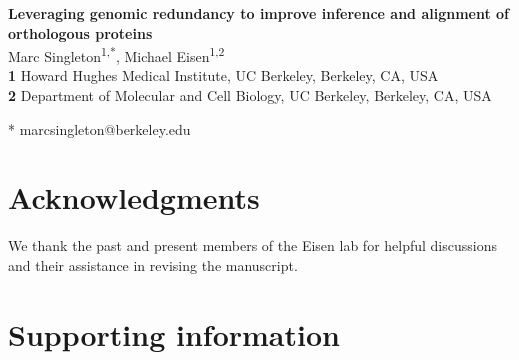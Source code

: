 \documentclass[11pt,letterpaper]{article}
\begin{document}
\begin{flushleft}
{\Large\textbf{Leveraging genomic redundancy to improve inference and alignment of orthologous proteins}}
\\
\bigskip
Marc Singleton\textsuperscript{1,*},
Michael Eisen\textsuperscript{1,2}
\\
\bigskip
\textbf{1} Howard Hughes Medical Institute, UC Berkeley, Berkeley, CA, USA
\\
\textbf{2} Department of Molecular and Cell Biology, UC Berkeley, Berkeley, CA, USA
\\
\bigskip

* marcsingleton@berkeley.edu

\end{flushleft}

\graphicspath{{figures/}}


\section{Acknowledgments}
We thank the past and present members of the Eisen lab for helpful discussions and their assistance in revising the manuscript.

\printbibliography

\clearpage

\setcounter{figure}{0}
\renewcommand{\thefigure}{S\arabic{figure}}
\setcounter{table}{0}
\renewcommand{\thetable}{S\arabic{table}}

\section*{Supporting information}

\end{document}
